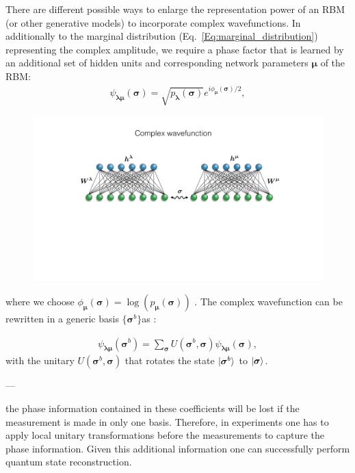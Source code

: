 \documentclass[submission, Phys]{SciPost}
\begin{document}
There are different possible ways to enlarge the representation power of an RBM (or other generative models) to 
incorporate complex wavefunctions.  
In additionally to the marginal distribution (Eq.~\ref{Eq:marginal_distribution}) representing the complex amplitude,
we require a phase factor that is learned by an additional set of hidden units and corresponding network parameters $\bm{\mu}$ of the RBM:
\begin{align}
	\psi_{\bm{\lambda} \bm{\mu}} (\bm{\sigma})= \sqrt{p_{\bm{\lambda}} (\bm{\sigma})} e^{i \phi_{\bm{\mu}} (\bm{\sigma})/2},
\end{align}
%
\begin{figure}[htpb]
    \centering
    \includegraphics[width=1\linewidth]{plots/ch3_complexNW.pdf}
    \caption{}
    \label{fig:}
\end{figure}
where we choose $\phi_{\bm{\mu}}(\bm{\sigma}) = \log (p_{\bm{\mu}} (\bm{\sigma}))$ \cite{torlai2018tomography}. 
The complex wavefunction can be rewritten in a generic basis $\{ \bm{\sigma}^b \}$as :

\begin{align}
	\psi_{\bm{\lambda} \bm{\mu}} (\bm{\sigma}^b)= \sum_{\bm{\sigma}} U (\bm{\sigma}^b, \bm{\sigma}) \psi_{\bm{\lambda} \bm{\mu}} (\bm{\sigma}),
\end{align}
%
with the unitary $U (\bm{\sigma}^b, \bm{\sigma})$ that rotates the state $\ket{\bm{\sigma}^b}$ to $\ket{\bm{\sigma}}$.

---

the phase information contained in these coefficients will be lost if the measurement
is made in only one basis. 
Therefore, in experiments one has to apply local unitary transformations before the measurements
to capture the phase information. Given this additional information one can successfully perform quantum state reconstruction.
\end{document}
